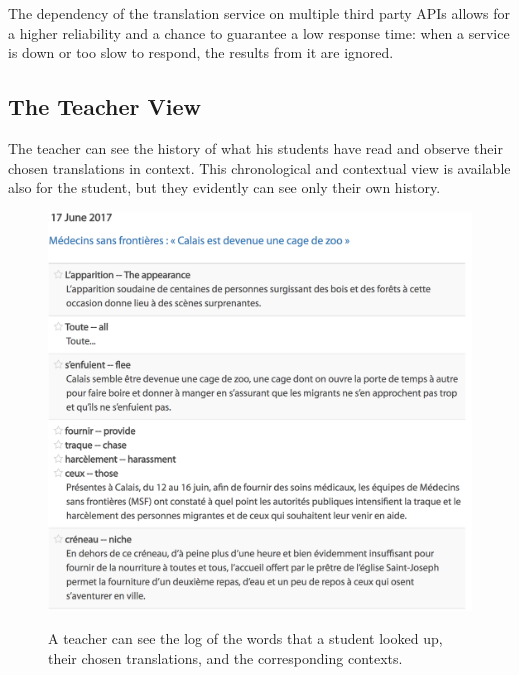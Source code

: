The dependency of the translation service on multiple third party APIs allows for a higher reliability and a chance to guarantee a low response time: when a service is down or too slow to respond, the results from it are ignored.

\subsection{The Teacher View}

The teacher can see the history of what his students have read and observe their chosen translations in context. This chronological and contextual view is available also for the student, but they evidently can see only their own history.

\begin{figure}[h!]
\centering
  \includegraphics[width=0.95\columnwidth]{figures/teacher_dashboard.png}
  \caption{A teacher can see the log of the words that a student looked up, their chosen translations, and the corresponding contexts.}{
  \label{exercise_translate}
  }
\end{figure}




